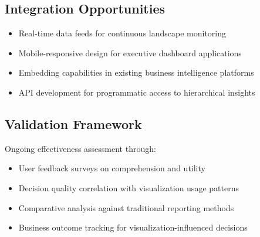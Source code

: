 \documentclass[11pt]{article}
\begin{document}
\subsection{Integration Opportunities}
\begin{itemize}
\item Real-time data feeds for continuous landscape monitoring
\item Mobile-responsive design for executive dashboard applications
\item Embedding capabilities in existing business intelligence platforms
\item API development for programmatic access to hierarchical insights
\end{itemize}

\subsection{Validation Framework}
Ongoing effectiveness assessment through:
\begin{itemize}
\item User feedback surveys on comprehension and utility
\item Decision quality correlation with visualization usage patterns
\item Comparative analysis against traditional reporting methods
\item Business outcome tracking for visualization-influenced decisions
\end{itemize}
\end{document}
